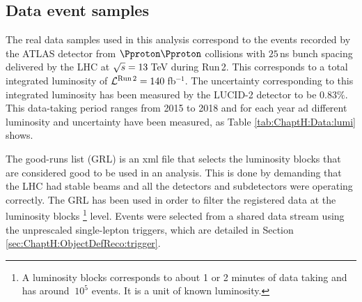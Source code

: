 \subsection{Data event samples}
\label{sec:ChaptH:Data_and_MC:Data}
The real data samples used in this analysis correspond to the events
recorded by the ATLAS detector from $\Pproton\Pproton$ collisions with $25\,$ns bunch spacing
delivered by the LHC at $\sqrt{s}=13\,$TeV during Run\,2. 
This corresponds to a total integrated luminosity of $\mathcal{L}^{\text{Run\,2}} = 140\,$fb$^{-1}$.
The uncertainty corresponding to this integrated luminosity has been measured by the LUCID-2
detector to be $0.83\%$. This data-taking period ranges from 2015 to 2018 and for each year
ad different luminosity and uncertainty have been measured, as Table \ref{tab:ChaptH:Data:lumi} shows.

\begin{table}[h]

  \caption{Total integrated luminosity per year with their relative uncertainties for the Run\,2.
    Additionally, the data-taking periods, run numbers and number of events are shown for each year.}
    \label{tab:ChaptH:Data:lumi}
\end{table}

The good-runs list (GRL) is an xml file that selects the luminosity blocks that are considered good
to be used in an analysis. This is done by demanding that the LHC had stable beams and all
the detectors and subdetectors were operating correctly.
The GRL has been used in order to filter the registered data at the luminosity blocks \footnote{A
luminosity blocks corresponds to about 1 or 2 minutes of data taking and has around $~10^{5}$ events. 
It is a unit of known luminosity.} level. %
Events were selected from a shared data stream using the unprescaled single-lepton triggers, 
which are detailed in Section \ref{sec:ChaptH:ObjectDefReco:trigger}.



